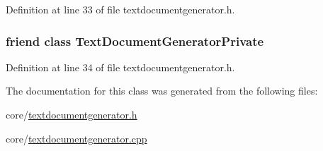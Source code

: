 Definition at line 33 of file textdocumentgenerator.\+h.

\hypertarget{classOkular_1_1TextDocumentConverter_a5349ae9a7f4c1aaa74f2727fcbcc2ebf}{
\subsubsection[{Text\+Document\+Generator\+Private}]{\setlength{\rightskip}{0pt plus 5cm}friend class {\bf Text\+Document\+Generator\+Private}\hspace{0.3cm}{\ttfamily [friend]}}}\label{classOkular_1_1TextDocumentConverter_a5349ae9a7f4c1aaa74f2727fcbcc2ebf}


Definition at line 34 of file textdocumentgenerator.\+h.



The documentation for this class was generated from the following files\+:\begin{DoxyCompactItemize}
\item 
core/\hyperlink{textdocumentgenerator_8h}{textdocumentgenerator.\+h}\item 
core/\hyperlink{textdocumentgenerator_8cpp}{textdocumentgenerator.\+cpp}\end{DoxyCompactItemize}
